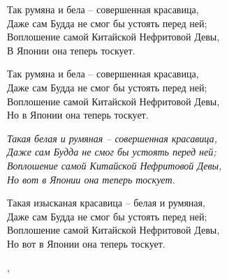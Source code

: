 \begin{ver}[1]
  \begin{verses}
    Так румяна и бела -- совершенная красавица,\\
    Даже сам Будда не смог бы устоять перед ней;\\
    Воплошение самой Китайской Нефритовой Девы,\\
    В Японии она теперь тоскует. 
  \end{verses}
\end{ver}

\begin{ver}[1]
  \begin{verses}
    Так румяна и бела -- совершенная красавица,\\
    Даже сам Будда не смог бы устоять перед ней;\\
    Воплошение самой Китайской Нефритовой Девы,\\
    Но в Японии она теперь тоскует. 
  \end{verses}
\end{ver}

\begin{ver}[2]
  \begin{verses}\it
    Такая белая и румяная -- совершенная красавица,\\
    Даже сам Будда не смог бы устоять перед ней;\\
    Воплошение самой Китайской Нефритовой Девы,\\
    Но вот в Японии она теперь тоскует. 
  \end{verses}
\end{ver}

\begin{ver}[2]
  \begin{verses}
    Такая изысканая красавица -- белая и румяная,\\
    Даже сам Будда не смог бы устоять перед ней;\\
    Воплошение самой Китайской Нефритовой Девы,\\
    Но вот в Японии она теперь тоскует. 
  \end{verses}
\end{ver}
\sep

